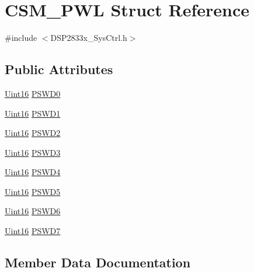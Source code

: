 \hypertarget{struct_c_s_m___p_w_l}{}\section{C\+S\+M\+\_\+\+P\+W\+L Struct Reference}
\label{struct_c_s_m___p_w_l}


{\ttfamily \#include $<$D\+S\+P2833x\+\_\+\+Sys\+Ctrl.\+h$>$}

\subsection*{Public Attributes}
\begin{DoxyCompactItemize}
\item 
\hyperlink{_d_s_p2833x___device_8h_a59a9f6be4562c327cbfb4f7e8e18f08b}{Uint16} \hyperlink{struct_c_s_m___p_w_l_a3d8f3f88f583af59df6436aa5cac7807}{P\+S\+W\+D0}
\item 
\hyperlink{_d_s_p2833x___device_8h_a59a9f6be4562c327cbfb4f7e8e18f08b}{Uint16} \hyperlink{struct_c_s_m___p_w_l_af3c3743d45b54af8d57a349bc1ab13a4}{P\+S\+W\+D1}
\item 
\hyperlink{_d_s_p2833x___device_8h_a59a9f6be4562c327cbfb4f7e8e18f08b}{Uint16} \hyperlink{struct_c_s_m___p_w_l_add8a4f2a2bcc3b4987a6622b2dec631a}{P\+S\+W\+D2}
\item 
\hyperlink{_d_s_p2833x___device_8h_a59a9f6be4562c327cbfb4f7e8e18f08b}{Uint16} \hyperlink{struct_c_s_m___p_w_l_a0423aae279c277031c59865c8231289c}{P\+S\+W\+D3}
\item 
\hyperlink{_d_s_p2833x___device_8h_a59a9f6be4562c327cbfb4f7e8e18f08b}{Uint16} \hyperlink{struct_c_s_m___p_w_l_a46d058d571dc38310acb1cc8972f8020}{P\+S\+W\+D4}
\item 
\hyperlink{_d_s_p2833x___device_8h_a59a9f6be4562c327cbfb4f7e8e18f08b}{Uint16} \hyperlink{struct_c_s_m___p_w_l_a68f79eeb333c4baf2cc0902c14db22f0}{P\+S\+W\+D5}
\item 
\hyperlink{_d_s_p2833x___device_8h_a59a9f6be4562c327cbfb4f7e8e18f08b}{Uint16} \hyperlink{struct_c_s_m___p_w_l_a4d58e243c2e2121bc0f87e12511421bd}{P\+S\+W\+D6}
\item 
\hyperlink{_d_s_p2833x___device_8h_a59a9f6be4562c327cbfb4f7e8e18f08b}{Uint16} \hyperlink{struct_c_s_m___p_w_l_abb13ae8c5d8b99203e18d5b0ea9c5792}{P\+S\+W\+D7}
\end{DoxyCompactItemize}


\subsection{Member Data Documentation}
\hypertarget{struct_c_s_m___p_w_l_a3d8f3f88f583af59df6436aa5cac7807}{}
